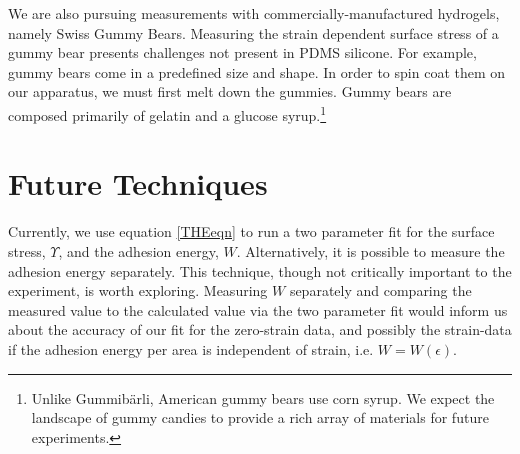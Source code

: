 We are also pursuing measurements with commercially-manufactured hydrogels, namely Swiss Gummy Bears. Measuring the strain dependent surface stress of a gummy bear presents challenges not present in PDMS silicone. For example, gummy bears come in a predefined size and shape. In order to spin coat them on our apparatus, we must first melt down the gummies. Gummy bears are composed primarily of gelatin and a glucose syrup.\footnote{Unlike Gummib{\"a}rli, American gummy bears use corn syrup. We expect the landscape of gummy candies to provide a rich array of materials for future experiments.}
  
\section{Future Techniques}
Currently, we use equation \ref{THEeqn} to run a two parameter fit for the surface stress, $ \Upsilon $, and the adhesion energy, $ W $. Alternatively, it is possible to measure the adhesion energy separately. This technique, though not critically important to the experiment, is worth exploring. Measuring $ W $ separately and comparing the measured value to the calculated value via the two parameter fit would inform us about the accuracy of our fit for the zero-strain data, and possibly the strain-data if the adhesion energy per area is independent of strain, i.e. $ W = W(\epsilon) $.   

